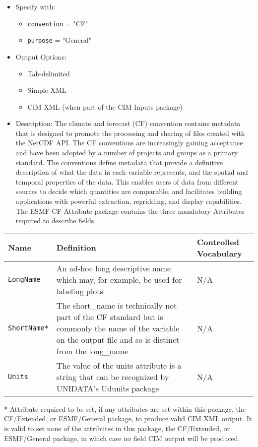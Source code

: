 \begin{itemize}
    \item Specify with:
    \begin{itemize}
        \item {\tt convention} = "CF"
        \item {\tt purpose} = "General"
    \end{itemize}
    \item Output Options:
    \begin{itemize}
        \item Tab-delimited
        \item Simple XML
        \item CIM XML (when part of the CIM Inputs package)
    \end{itemize}
    \item  Description: The climate and forecast (CF) convention contains metadata that is designed to promote the processing and sharing of files created with the NetCDF API. The CF conventions are increasingly gaining acceptance and have been adopted by a number of projects and groups as a primary standard. The conventions define metadata that provide a definitive description of what the data in each variable represents, and the spatial and temporal properties of the data. This enables users of data from different sources to decide which quantities are comparable, and facilitates building applications with powerful extraction, regridding, and display capabilities. The ESMF CF Attribute package contains the three mandatory Attributes required to describe fields.
\end{itemize}

\begin{tabular}{|p{5cm}|p{5cm}|p{35mm}|}
    \hline\hline
    {\bf Name } & {\bf Definition} & {\bf Controlled Vocabulary} \\
    \hline\hline
    {\tt LongName} & An ad-hoc long descriptive name which may, for example, be used for labeling plots & N/A\\
    {\tt ShortName*}  & The short\_name is technically not part of the CF standard but is commonly the name of the variable on the output file and so is
 distinct from the long\_name & N/A \\
    {\tt Units}  & The value of the units attribute is a string that can be recognized by UNIDATA's Udunits package & N/A\\
    \hline\hline
\end{tabular}
\linebreak
* Attribute required to be set, if any attributes are set within this package, the CF/Extended, or ESMF/General package, to produce valid CIM XML output. It is valid to set none of the attributes in this package, the CF/Extended, or ESMF/General package, in which case no field CIM output will be produced. \\

